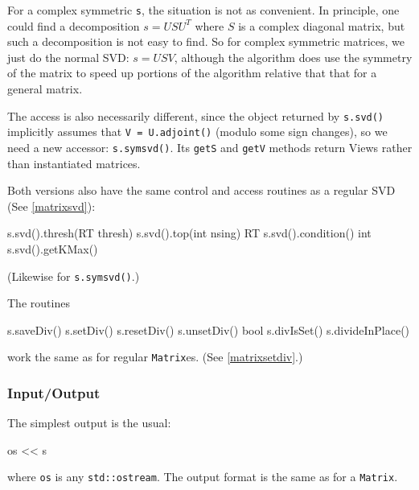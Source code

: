 \documentclass[twoside,letterpaper,11pt]{article}
\renewcommand{\tt}[1]{{\lstinline {#1}}}
\begin{document}
\begin{enumerate}
For a complex symmetric \tt{s}, the situation is not as convenient.
In principle, one could find a decomposition $s = USU^T$ where $S$ is 
a complex diagonal matrix, but such a decomposition is not easy to find. 
So for complex symmetric matrices, we
just do the normal SVD: $s = USV$, although the algorithm
does use the symmetry of the matrix to 
speed up portions of the algorithm relative that that for a general matrix.

The access is also necessarily different, since the object returned by 
\tt{s.svd()} implicitly assumes that \tt{V = U.adjoint()} (modulo some sign changes), 
so we need a 
new accessor: \tt{s.symsvd()}.  Its \tt{getS} and \tt{getV} methods return Views
rather than instantiated matrices.

Both versions also have the same control and access routines as a regular SVD
(See \ref{matrixsvd}):
\begin{tmvcode}
s.svd().thresh(RT thresh)
s.svd().top(int nsing)
RT s.svd().condition()
int s.svd().getKMax()
\end{tmvcode}
(Likewise for \tt{s.symsvd()}.)

\end{enumerate}
The routines 
\begin{tmvcode}
s.saveDiv()
s.setDiv()
s.resetDiv()
s.unsetDiv()
bool s.divIsSet()
s.divideInPlace()
\end{tmvcode}
work the same as for regular \tt{Matrix}es.
(See \ref{matrixsetdiv}.)

\subsubsection{Input/Output}

The simplest output is the usual:
\begin{tmvcode}
os << s
\end{tmvcode}
where \tt{os} is any \tt{std::ostream}.
The output format is the same as for a \tt{Matrix}.
\end{document}
